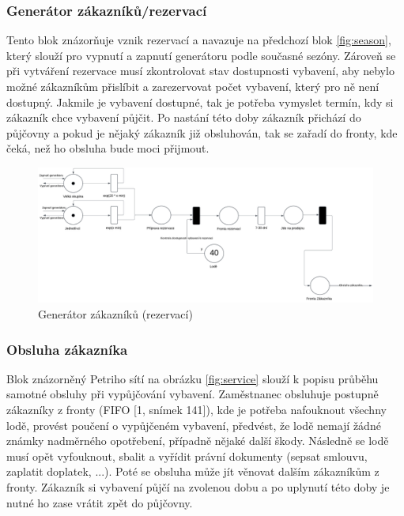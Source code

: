 \documentclass[a4paper, 12pt, hidelinks]{article}
\begin{document}
\subsubsection{Generátor zákazníků/rezervací}

Tento blok znázorňuje vznik rezervací a navazuje na předchozí blok \ref{fig:season}, který slouží pro vypnutí a zapnutí generátoru podle současné sezóny. Zároveň se při vytváření rezervace musí zkontrolovat stav dostupnosti vybavení, aby nebylo možné zákazníkům přislíbit a zarezervovat počet vybavení, který pro ně není dostupný. Jakmile je vybavení dostupné, tak je potřeba vymyslet termín, kdy si zákazník chce vybavení půjčit. Po nastání této doby zákazník přichází do půjčovny a pokud je nějaký zákazník již obsluhován, tak se zařadí do fronty, kde čeká, než ho obsluha bude moci přijmout.

\begin{figure}[h]
    \centering
    \includegraphics[width=1.0\linewidth]{images/rezervace.png}
    \caption{Generátor zákazníků (rezervací)}
    \label{fig:reservation}
\end{figure}

\newpage

\subsubsection{Obsluha zákazníka}

Blok znázorněný Petriho sítí na obrázku \ref{fig:service} slouží k popisu průběhu samotné obsluhy při vypůjčování vybavení. Zaměstnanec obsluhuje postupně zákazníky z fronty (FIFO [1, snímek 141]), kde je potřeba nafouknout všechny lodě, provést poučení o vypůjčeném vybavení, předvést, že lodě nemají žádné známky nadměrného opotřebení, případně nějaké další škody. Následně se lodě musí opět vyfouknout, sbalit a vyřídit právní dokumenty (sepsat smlouvu, zaplatit doplatek, ...). Poté se obsluha může jít věnovat dalším zákazníkům z fronty. Zákazník si vybavení půjčí na zvolenou dobu a po uplynutí této doby je nutné ho zase vrátit zpět do půjčovny.
\end{document}
